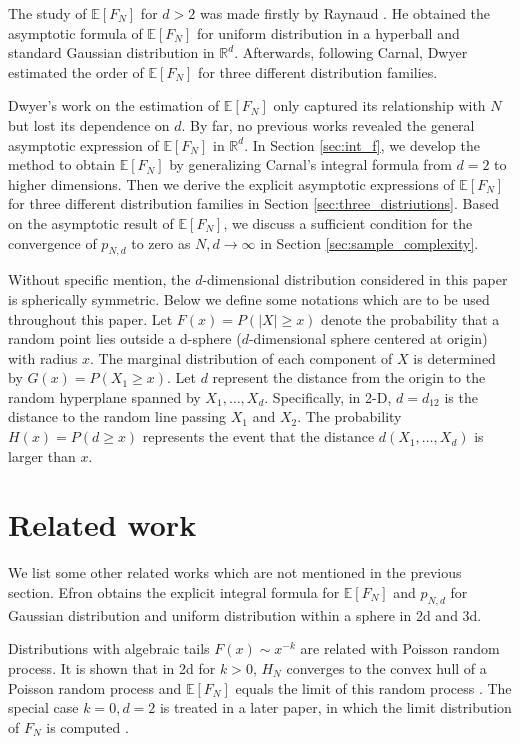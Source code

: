 \documentclass{aptpub}
\def\E{\mathbb{E}}
\def\R{\mathbb{R}}
\begin{document}
The study of $\E[F_N]$ for $d>2$ was made firstly by
Raynaud
\cite{raynaud1970enveloppe}.
He obtained the asymptotic formula of $\E[F_N]$
for uniform distribution in a hyperball
and standard Gaussian distribution in $\mathbb{R}^d$.
Afterwards, following Carnal, Dwyer \cite{dwyer1991convex}
estimated the order of $\E[F_N]$ 
for three different distribution families.

Dwyer's work on the estimation of $\E[F_N]$ only captured its relationship with $N$ but lost its
dependence on $d$. By far, no previous works revealed the general asymptotic expression of $\E[F_N]$ in $\R^d$.
In Section \ref{sec:int_f}, we develop the method to obtain $\E[F_N]$ by generalizing Carnal's integral formula
from $d=2$ to higher dimensions.
Then we derive the explicit asymptotic
expressions of $\E[F_N]$ for three different distribution families in Section \ref{sec:three_distriutions}.
Based on the asymptotic result of $\E[F_N]$,
we discuss a sufficient condition for the convergence of $p_{N,d}$ to zero as $N,d \to \infty$
in Section \ref{sec:sample_complexity}.


Without specific mention, the $d$-dimensional distribution considered in this paper is spherically symmetric.
Below we define some notations which are to be used throughout this paper.
Let $F(x)=P(|X|\geq x)$ denote the probability that a random point lies outside
a d-sphere ($d$-dimensional sphere centered at origin) with radius $x$.
The marginal distribution of each component of $X$ is determined by $G(x)=P(X_1\geq x)$.
Let $d$ represent the distance from the origin to the random hyperplane spanned by $X_1, \dots, X_d$.
Specifically, in 2-D, $d=d_{12}$ is the distance to the random line passing $X_1$ and $X_2$.
The probability $H(x)=P(d\geq x)$ represents the event that the distance $d(X_1, \dots, X_d)$ is larger than $x$.

\section{Related work}
We list some other related works which are not mentioned in the previous section.
Efron \cite{efron1965convex} obtains the explicit integral formula for $\E[F_N]$ and $p_{N,d}$ 
for Gaussian distribution and uniform distribution within a sphere in 2d and 3d.

Distributions with algebraic tails $F(x) \sim x^{-k}$ are related with Poisson random process.
It is shown that in 2d for $k>0$, $H_N$ converges to the convex hull of a Poisson random process and $\E[F_N]$
equals the limit of this random process \cite{davis1987convex}.
The special case $k=0, d=2$ is treated in a later paper, in which the
limit distribution of $F_N$ is computed \cite{aldous1991number}.
\end{document}
